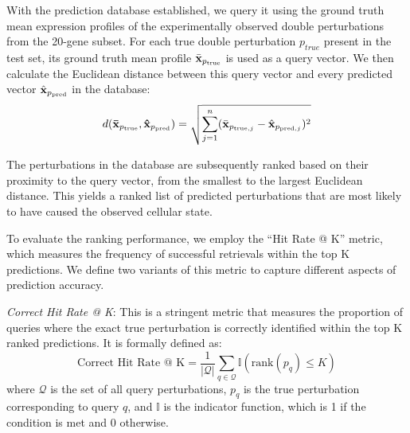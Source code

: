 With the prediction database established, we query it using the ground truth mean expression profiles of the experimentally observed double perturbations from the 20-gene subset.
For each true double perturbation $p_{true}$ present in the test set, its ground truth mean profile $\bar{{\mathbf{x}}}_{p_{\text{true}}}$ is used as a query vector.
We then calculate the Euclidean distance between this query vector and every predicted vector $\hat{{\mathbf{x}}}_{p_{\text{pred}}}$ in the database:
\begin{equation}
    d(\mathbf{\bar{{\mathbf{x}}}}_{p_{\text{true}}}, \mathbf{\hat{{\mathbf{x}}}}_{p_{\text{pred}}}) = \sqrt{\sum_{j=1}^{n} (\bar{{\mathbf{x}}}_{p_{\text{true},j}} - \hat{{\mathbf{x}}}_{p_{\text{pred},j}})^2}
    \label{eq:app:euclidean_distance}
\end{equation}

The perturbations in the database are subsequently ranked based on their proximity to the query vector, from the smallest to the largest Euclidean distance.
This yields a ranked list of predicted perturbations that are most likely to have caused the observed cellular state.

To evaluate the ranking performance, we employ the ``Hit Rate @ K'' metric, which measures the frequency of successful retrievals within the top K predictions.
We define two variants of this metric to capture different aspects of prediction accuracy.

\emph{Correct Hit Rate @ K}: This is a stringent metric that measures the proportion of queries where the exact true perturbation is correctly identified within the top K ranked predictions.
It is formally defined as:
\begin{equation}
    \text{Correct Hit Rate @ K} = \frac{1}{|\mathcal{Q}|} \sum_{q \in \mathcal{Q}} \mathbb{I}(\text{rank}(p_q) \le K)
    \label{eq:app:correct_hitrate}
\end{equation}
where $\mathcal{Q}$ is the set of all query perturbations, $p_q$ is the true perturbation corresponding to query $q$, and $\mathbb{I}$ is the indicator function, which is 1 if the condition is met and 0 otherwise.

